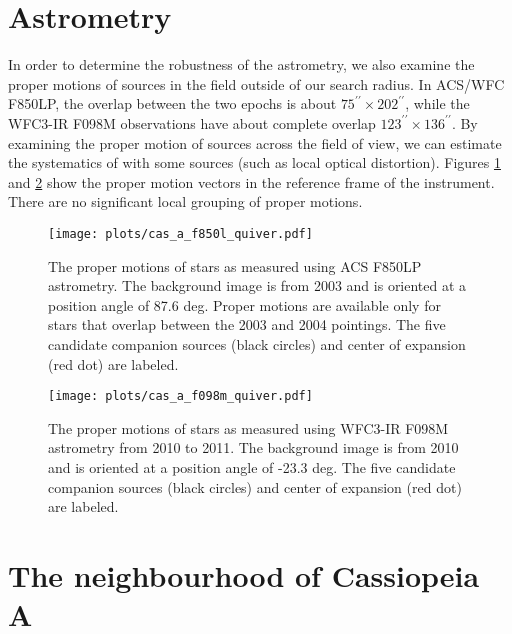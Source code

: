 \documentclass{aa}
\begin{document}
\begin{appendix}

\section{Astrometry}

In order to determine the robustness of the astrometry, we also examine the proper motions of sources in the field outside of our search radius. In ACS/WFC F850LP, the overlap between the two epochs is about $75^{\prime\prime}\times202^{\prime\prime}$, while the WFC3-IR F098M observations have about complete overlap $123^{\prime\prime}\times136^{\prime\prime}$. By examining the proper motion of sources across the field of view, we can estimate the systematics of with some sources (such as local optical distortion). Figures \ref{fig:f850l_quiver} and \ref{fig:f098m_quiver} show the proper motion vectors in the reference frame of the instrument. There are no significant local grouping of proper motions.

\begin{figure*}[h!]
\begin{subfigure}[t]{.47\textwidth}
 \centering
	 \texttt{[image: plots/cas\_a\_f850l\_quiver.pdf]}
         \caption{The proper motions of stars as measured using ACS F850LP astrometry. The background image is from 2003
         and is oriented at a position angle of 87.6 deg.
         Proper motions are available only for stars that overlap between the 2003 and 2004 pointings. The five candidate companion sources (black circles) and center of expansion (red dot) are labeled. }
       \label{fig:f850l_quiver}
 \end{subfigure}\hfill
 \begin{subfigure}[t]{.47\textwidth}
 \centering
	 \texttt{[image: plots/cas\_a\_f098m\_quiver.pdf]}
         \caption{The proper motions of stars as measured using WFC3-IR F098M astrometry from 2010 to 2011. The background image is from 2010 and
         is oriented at a position angle of -23.3 deg.
         The five candidate companion sources (black circles) and center of expansion (red dot) are labeled. }
       \label{fig:f098m_quiver}
        \end{subfigure}
\caption{Overview of the proper motion measurements for the two datasets from ACS F850LP \& WFC3-IR F098M}
\end{figure*}

\section{The neighbourhood of Cassiopeia A}
\label{sec:neighbourhood}


\end{appendix}
\end{document}
